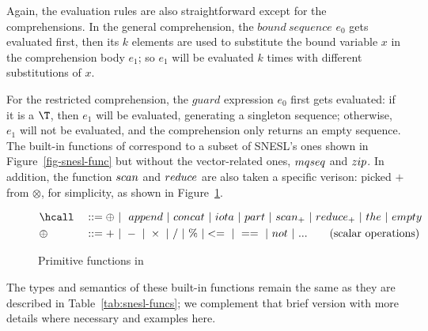 Again, the evaluation rules are also straightforward except for the comprehensions.
In the general comprehension, the $bound \ sequence$ $e_0$ gets evaluated first, then its $k$ elements are used to substitute the bound variable $x$ in the comprehension body $e_1$; so $e_1$ will be evaluated $k$ times with different substitutions of $x$.

For the restricted comprehension, the $guard$ expression $e_0$ first gets evaluated: if it is a $\T$, then $e_1$ will be evaluated, generating a singleton sequence; otherwise, $e_1$ will not be evaluated, and the comprehension only returns an empty sequence. \\


The built-in functions of \mysnesl correspond to a subset of SNESL's ones shown in Figure~\ref{fig-snesl-func} but without the vector-related ones, $\*{mqseq}$ and $\*{zip}$. 
In addition, the function $\*{scan}$ and $\*{reduce}$ are also
taken a specific verison: picked $+$ from $\otimes$, for simplicity, as shown in Figure~\ref{fig-mysnesl-func}. 


\begin{figure}[H]\large
	\begin{alignat*}{2} 
	&\hcall && ::= \oplus \ | \  \ \*{append} \ | \ \*{concat}  \ | \ \*{iota}  \ | \ \*{part}  \ | \ \*{scan}_+ \ | \ \*{reduce}_{+} \ | \ \*{the}  \ | \ \*{empty} \\	
	& \oplus  \ && :: = + \ | \ - \ | \ \times \ |  \  / \ | \ \% \ | <= \ | \ == \ | \  \*{not} \ | \ ... \tag{scalar operations} 
	\end{alignat*}
	\caption{Primitive functions in \mysnesl \label{fig-mysnesl-func}}
\end{figure}

The types and semantics of these built-in functions remain the same as they are described in Table~\ref{tab:snesl-funcs}; we complement that brief version with more details where necessary and examples here.

